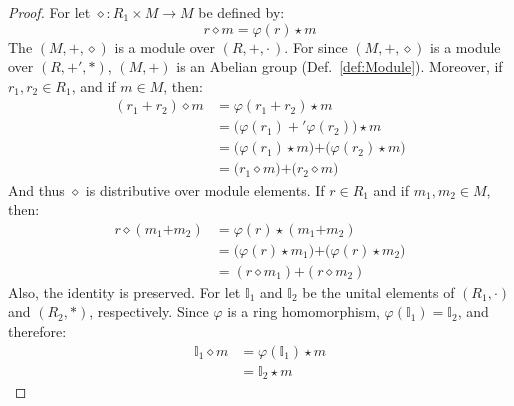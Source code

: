     \begin{proof}
        For let $\diamond:R_{1}\times{M}\rightarrow{M}$ be defined by:
        \begin{equation}
            r\diamond{m}=\varphi(r)\star{m}
        \end{equation}
        The $(M,\boldsymbol{+},\diamond)$ is a module over $(R,+,\cdot\,)$.
        For since $(M,\boldsymbol{+},\diamond)$ is a module over $(R,+',*)$,
        $(M,\boldsymbol{+})$ is an Abelian group (Def.~\ref{def:Module}).
        Moreover, if $r_{1},r_{2}\in{R}_{1}$, and if $m\in{M}$, then:
        \begin{align}
            (r_{1}+r_{2})\diamond{m}&=\varphi(r_{1}+r_{2})\star{m}
            \tag{Definition of $\diamond$}\\
            &=\Big(\varphi(r_{1})+'\varphi(r_{2})\Big)\star{m}
            \tag{$\varphi$ is a Homomorphism}\\
            &=\big(\varphi(r_{1})\star{m}\big)\boldsymbol{+}
                \big(\varphi(r_{2})\star{m}\big)
            \tag{Distributive Property}\\
            &=\big(r_{1}\diamond{m}\big)\boldsymbol{+}\big(r_{2}\diamond{m}\big)
            \tag{Definition of $\diamond$}
        \end{align}
        And thus $\diamond$ is distributive over module elements. If
        $r\in{R}_{1}$ and if $m_{1},m_{2}\in{M}$, then:
        \begin{align}
            r\diamond(m_{1}\boldsymbol{+}m_{2})
            &=\varphi(r)\star(m_{1}\boldsymbol{+}m_{2})
            \tag{Definition of $\diamond$}\\
            &=\big(\varphi(r)\star{m}_{1}\big)\boldsymbol{+}
                \big(\varphi(r)\star{m}_{2}\big)
            \tag{Distributive Property}\\
            &=(r\diamond{m}_{1})\boldsymbol{+}(r\diamond{m}_{2})
            \tag{Definition of $\diamond$}
        \end{align}
        Also, the identity is preserved. For let $\mathbb{I}_{1}$ and
        $\mathbb{I}_{2}$ be the unital elements of $(R_{1},\cdot)$ and
        $(R_{2},*)$, respectively. Since $\varphi$ is a ring homomorphism,
        $\varphi(\mathbb{I}_{1})=\mathbb{I}_{2}$, and therefore:
        \begin{align}
            \mathbb{I}_{1}\diamond{m}
            &=\varphi(\mathbb{I}_{1})\star{m}
            \tag{Definition of $\diamond$}\\
            &=\mathbb{I}_{2}\star{m}

\end{align}
\end{proof}
